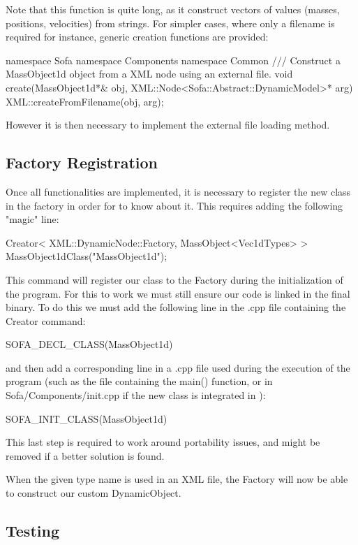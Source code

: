 Note that this function is quite long, as it construct vectors of values (masses, positions, velocities) from strings. For simpler cases, where only a filename is required for instance, generic creation functions are provided:
\begin{code_cpp}
namespace Sofa { namespace Components { namespace Common {
/// Construct a MassObject1d object from a XML node using an external file.
void create(MassObject1d*& obj, XML::Node<Sofa::Abstract::DynamicModel>* arg)
{
  XML::createFromFilename(obj, arg);
} } } }
\end{code_cpp}
However it is then necessary to implement the external file loading method.

\subsection{Factory Registration}

Once all functionalities are implemented, it is necessary to register the new class in the  factory in order for \sofa{} to know about it. This requires adding the following "magic" line:

\begin{code_cpp}
Creator< XML::DynamicNode::Factory, MassObject<Vec1dTypes> >
  MassObject1dClass("MassObject1d");
\end{code_cpp}

This command will register our class to the Factory during the initialization of the program. For this to work we must still ensure our code is linked in the final binary. To do this we must add the following line in the .cpp file containing the Creator command:
\begin{code_cpp}
SOFA_DECL_CLASS(MassObject1d)
\end{code_cpp}
and then add a corresponding line in a .cpp file used during the execution of the program (such as the file containing the main() function, or in Sofa/Components/init.cpp if the new class is integrated in \sofa{}):
\begin{code_cpp}
SOFA_INIT_CLASS(MassObject1d)
\end{code_cpp}
This last step is required to work around portability issues, and might be removed if a better solution is found.

When the given type name is used in an XML file, the Factory will now be able to construct our custom DynamicObject.

\subsection{Testing}

